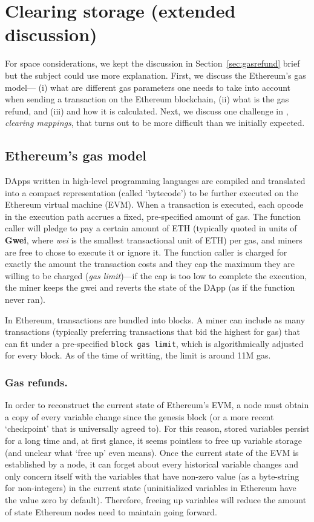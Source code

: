 

\section{Clearing storage (extended discussion)}

For space considerations, we kept the discussion in Section~\ref{sec:gasrefund} brief but the subject could use more explanation. First, we discuss the Ethereum's gas model--- (i) what are different gas parameters one needs to take into account when sending a transaction on the Ethereum blockchain, (ii) what is the gas refund, and (iii) and how it is calculated.  Next, we discuss one challenge in \cm, \textit{clearing mappings}, that turns out to be more difficult than we initially expected.

\subsection{Ethereum's gas model}

DApps written in high-level programming languages are compiled and translated into a compact representation (called ‘bytecode’) to be further executed on the Ethereum virtual machine (EVM). When a transaction is executed, each opcode in the execution path accrues a fixed, pre-specified amount of gas. The function caller will pledge to pay a certain amount of ETH (typically quoted in units of \textbf{Gwei}, where \textit{wei} is the smallest transactional unit of ETH) per gas, and miners are free to chose to execute it or ignore it. The function caller is charged for exactly the amount the transaction costs and they cap the maximum they are willing to be charged (\textit{gas limit})---if the cap is too low to complete the execution, the miner keeps the gwei and reverts the state of the DApp (as if the function never ran).

In Ethereum, transactions are bundled into blocks. A miner can include as many transactions (typically preferring transactions that bid the highest for gas) that can fit under a pre-specified \texttt{block gas limit}, which is algorithmically adjusted for every block. As of the time of writting, the limit is around 11M gas.

\subsubsection{Gas refunds.} In order to reconstruct the current state of Ethereum's EVM, a node must obtain a copy of every variable change since the genesis block (or a more recent `checkpoint' that is universally agreed to). For this reason, stored variables persist for a long time and, at first glance, it seems pointless to free up variable storage (and unclear what `free up' even means). Once the current state of the EVM is established by a node, it can forget about every historical variable changes and only concern itself with the variables that have non-zero value (as a byte-string for non-integers) in the current state (uninitialized variables in Ethereum have the value zero by default). Therefore, freeing up variables will reduce the amount of state Ethereum nodes need to maintain going forward.

